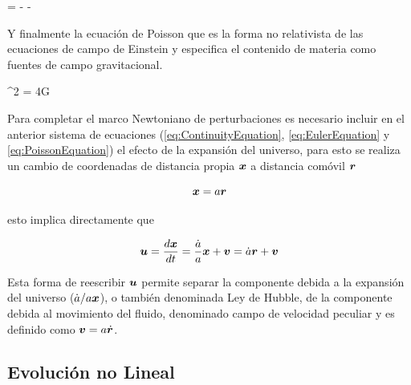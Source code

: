 {  = - - \nabla \phi }


Y finalmente la ecuación de Poisson que es la forma no relativista de las 
ecuaciones de campo de Einstein y especifica el contenido de materia como
fuentes de campo gravitacional.
	
	
{ \nabla^2 \varphi = 4\pi G \rho }


Para completar el marco Newtoniano de perturbaciones es necesario incluir 
en el anterior sistema de ecuaciones (\ref{eq:ContinuityEquation}, 
\ref{eq:EulerEquation} y \ref{eq:PoissonEquation}) el efecto de la 
expansión del universo, para esto se realiza un cambio de coordenadas de
distancia propia $\boldsymbol{ x }$ a distancia comóvil $\boldsymbol{ r }$


\[\boldsymbol{ x } = a \boldsymbol{ r }\]


esto implica directamente que


\[\boldsymbol{ u } = \frac{ d \boldsymbol{ x } }{d t} = 
\frac{\dot a}{a}\boldsymbol{ x } + \boldsymbol{ v } = \dot a \boldsymbol{ r } + \boldsymbol{ v }\]


Esta forma de reescribir $\boldsymbol{ u }$ permite separar la componente debida a la
expansión del universo ($\dot a/a \boldsymbol{ x }$), o también denominada Ley de 
Hubble, de la componente debida al movimiento del fluido, denominado campo 
de velocidad peculiar y es definido como $\boldsymbol{ v } = a \dot{ \boldsymbol{ r }}$.

	
	\subsection{Evolución no Lineal}
	\label{subsec:NonLinearEvolution}






